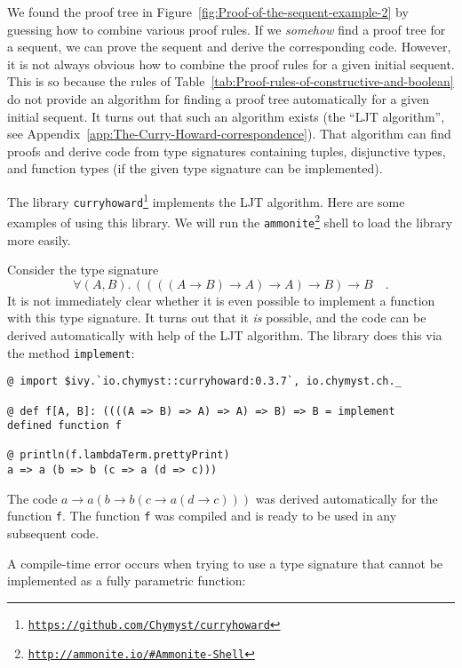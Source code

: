 We found the proof tree in Figure~\ref{fig:Proof-of-the-sequent-example-2}
by guessing how to combine various proof rules. If we \emph{somehow}
find a proof tree for a sequent, we can prove the sequent and derive
the corresponding code. However, it is not always obvious how to combine
the proof rules for a given initial sequent. This is so because the
rules of Table~\ref{tab:Proof-rules-of-constructive-and-boolean}
do not provide an algorithm for finding a proof tree automatically
for a given initial sequent. It turns out that such an algorithm exists
(the ``LJT algorithm'', see Appendix~\ref{app:The-Curry-Howard-correspondence}).
That algorithm can find proofs and derive code from type signatures
containing tuples, disjunctive types, and function types (if the given
type signature can be implemented).

The library \texttt{curryhoward}\footnote{\texttt{\href{https://github.com/Chymyst/curryhoward}{https://github.com/Chymyst/curryhoward}}}
implements the LJT algorithm. Here are some examples of using this
library. We will run the \texttt{ammonite}\footnote{\texttt{\href{http://ammonite.io/\#Ammonite-Shell}{http://ammonite.io/\#Ammonite-Shell}}}
shell to load the library more easily.

Consider the type signature 
\[
\forall(A,B).\,\left(\left(\left(\left(A\rightarrow B\right)\rightarrow A\right)\rightarrow A\right)\rightarrow B\right)\rightarrow B\quad.
\]
It is not immediately clear whether it is even possible to implement
a function with this type signature. It turns out that it \emph{is}
possible, and the code can be derived automatically with help of the
LJT algorithm. The library does this via the method \lstinline!implement!:
\begin{lstlisting}
@ import $ivy.`io.chymyst::curryhoward:0.3.7`, io.chymyst.ch._

@ def f[A, B]: ((((A => B) => A) => A) => B) => B = implement
defined function f

@ println(f.lambdaTerm.prettyPrint)
a => a (b => b (c => a (d => c)))
\end{lstlisting}
The code $a\rightarrow a\left(b\rightarrow b\left(c\rightarrow a\left(d\rightarrow c\right)\right)\right)$
was derived automatically for the function \lstinline!f!. The function
\lstinline!f! was compiled and is ready to be used in any subsequent
code.

A compile-time error occurs when trying to use a type signature that
cannot be implemented as a fully parametric function:

